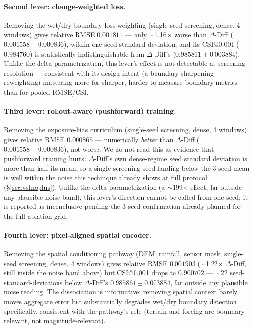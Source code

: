 \documentclass[11pt]{article}
\newcommand{\ours}{\mbox{$\Delta$-Diff}}
\begin{document}
\paragraph{Second lever: change-weighted loss.} Removing the wet/dry
boundary loss weighting (single-seed screening, dense, 4 windows) gives
relative RMSE $0.001811$ --- only $\sim$1.16$\times$ worse than \ours{}
($0.001558\pm0.000836$), within one seed standard deviation, and its
CSI@0.001 ($0.984760$) is statistically indistinguishable from \ours{}'s
($0.985861\pm0.003884$). Unlike the delta parametrization, this lever's
effect is not detectable at screening resolution --- consistent with its
design intent (a boundary-sharpening reweighting) mattering more for
sharper, harder-to-measure boundary metrics than for pooled RMSE/CSI.

\paragraph{Third lever: rollout-aware (pushforward) training.} Removing
the exposure-bias curriculum (single-seed screening, dense, 4 windows)
gives relative RMSE $0.000865$ --- numerically \emph{better} than
\ours{} ($0.001558\pm0.000836$), not worse. We do not read this as
evidence that pushforward training hurts: \ours{}'s own dense-regime
seed standard deviation is more than half its mean, so a single
screening seed landing below the 3-seed mean is well within the noise
this technique already shows at full protocol (\S\ref{sec:vsfnoplus}).
Unlike the delta parametrization (a $\sim$199$\times$ effect, far
outside any plausible noise band), this lever's direction cannot be
called from one seed; it is reported as inconclusive pending the
3-seed confirmation already planned for the full ablation grid.

\paragraph{Fourth lever: pixel-aligned spatial encoder.} Removing the
spatial conditioning pathway (DEM, rainfall, sensor mask; single-seed
screening, dense, 4 windows) gives relative RMSE $0.001903$
($\sim$1.22$\times$ \ours{}, still inside the noise band above) but
CSI@0.001 drops to $0.900702$ --- $\sim$22 seed-standard-deviations
below \ours{}'s $0.985861\pm0.003884$, far outside any plausible noise
reading. The dissociation is informative: removing spatial context
barely moves aggregate error but substantially degrades wet/dry
boundary detection specifically, consistent with the pathway's role
(terrain and forcing are boundary-relevant, not magnitude-relevant).
\end{document}
